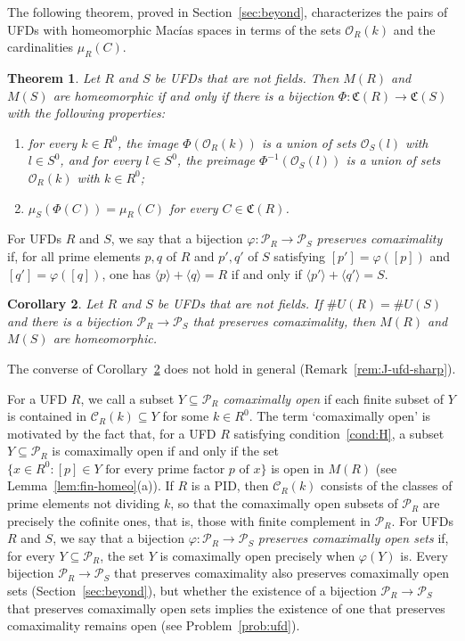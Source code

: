 \documentclass[12pt,reqno,a4paper]{amsart}
\newcommand{\Pe}{\mathcal{P}}
\theoremstyle{plain}
\newtheorem{theorem}{Theorem}[section]
\newtheorem{corollary}[theorem]{Corollary}
\theoremstyle{definition}
\begin{document}
The following theorem, proved in Section~\ref{sec:beyond}, characterizes the pairs of UFDs with homeomorphic Mac\'ias spaces in terms of the sets $\mathcal{O}_R(k)$ and the cardinalities $\mu_R(C)$.
\begin{theorem}\label{thm:ufd-general}
Let $R$ and $S$ be UFDs that are not fields. Then $M(R)$ and $M(S)$ are homeomorphic if and only if there is a bijection $\Phi\colon\mathfrak{C}(R)\to\mathfrak{C}(S)$ with the following properties:
\begin{enumerate}[label=\textup{(\roman*)}]
\item for every $k\in R^0$, the image $\Phi(\mathcal{O}_R(k))$ is a union of sets $\mathcal{O}_S(l)$ with $l\in S^0$, and for every $l\in S^0$, the preimage $\Phi^{-1}(\mathcal{O}_S(l))$ is a union of sets $\mathcal{O}_R(k)$ with $k\in R^0$;
\item $\mu_S(\Phi(C))=\mu_R(C)$ for every $C\in\mathfrak{C}(R)$.
\end{enumerate}
\end{theorem}

For UFDs $R$ and $S$, we say that a bijection $\varphi\colon\Pe_R\to\Pe_S$ \emph{preserves comaximality} if, for all prime elements $p,q$ of $R$ and $p',q'$ of $S$ satisfying $[p']=\varphi([p])$ and $[q']=\varphi([q])$, one has $\langle p\rangle+\langle q\rangle=R$ if and only if $\langle p'\rangle+\langle q'\rangle=S$.
\begin{corollary}\label{cor:comax}
Let $R$ and $S$ be UFDs that are not fields. If $\#U(R)=\#U(S)$ and there is a bijection $\Pe_R\to\Pe_S$ that preserves comaximality, then $M(R)$ and $M(S)$ are homeomorphic.
\end{corollary}
The converse of Corollary~\ref{cor:comax} does not hold in general (Remark~\ref{rem:J-ufd-sharp}).

For a UFD $R$, we call a subset $Y\subseteq\Pe_R$ \emph{comaximally open} if each finite subset of $Y$ is contained in $\mathcal{C}_R(k)\subseteq Y$ for some $k\in R^0$. The term `comaximally open' is motivated by the fact that, for a UFD $R$ satisfying condition~\ref{cond:H}, a subset $Y\subseteq\Pe_R$ is comaximally open if and only if the set $\{x\in R^0:[p]\in Y\text{ for every prime factor }p\text{ of }x\}$ is open in $M(R)$ (see Lemma~\ref{lem:fin-homeo}(a)). If $R$ is a PID, then $\mathcal{C}_R(k)$ consists of the classes of prime elements not dividing $k$, so that the comaximally open subsets of $\Pe_R$ are precisely the cofinite ones, that is, those with finite complement in $\Pe_R$. For UFDs $R$ and $S$, we say that a bijection $\varphi\colon\Pe_R\to\Pe_S$ \emph{preserves comaximally open sets} if, for every $Y\subseteq\Pe_R$, the set $Y$ is comaximally open precisely when $\varphi(Y)$ is. Every bijection $\Pe_R\to\Pe_S$ that preserves comaximality also preserves comaximally open sets (Section~\ref{sec:beyond}), but whether the existence of a bijection $\Pe_R\to\Pe_S$ that preserves comaximally open sets implies the existence of one that preserves comaximality remains open (see Problem~\ref{prob:ufd}).
\end{document}

